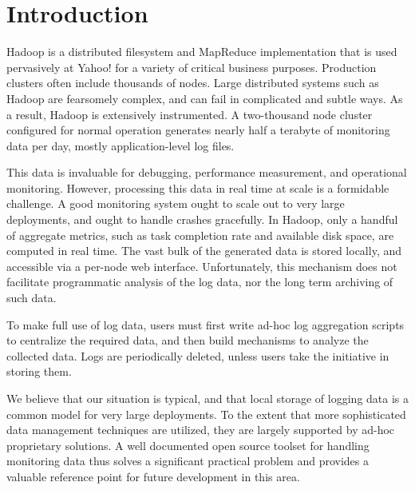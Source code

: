 \documentclass[letterpaper,twocolumn,10pt]{article}
\begin{document}
\section{Introduction}
\label{sec:introduction}

Hadoop is a distributed filesystem and MapReduce \cite{mapreduce} implementation that is used pervasively at Yahoo! for a variety of critical business purposes.  Production clusters often include thousands of nodes. Large distributed systems such as Hadoop are fearsomely complex, and can fail in complicated and subtle ways. As a result, Hadoop is extensively instrumented.  A two-thousand node cluster configured for normal operation generates nearly half a terabyte of monitoring data per day, mostly application-level log files.

This data is invaluable for debugging, performance measurement, and operational monitoring.  However, processing this data in real time at scale is a formidable challenge. A good monitoring system ought to scale out to very large deployments, and ought to handle crashes gracefully.  In Hadoop, only a handful of aggregate metrics, such as task completion rate and available disk space, are computed in real time. The vast bulk of the generated data is stored locally, and accessible via a per-node web interface.  Unfortunately, this mechanism does not facilitate programmatic analysis of the log data, nor the long term archiving of such data.

To make full use of log data, users must first write ad-hoc log aggregation scripts to centralize the required data, and then build mechanisms to analyze the collected data.  Logs are periodically deleted, unless users take the initiative in storing them.

We believe that our situation is typical, and that local storage of logging data is a common model for very large deployments.  To the extent that more sophisticated data management techniques are utilized, they are largely supported by ad-hoc proprietary solutions.  
A well documented open source toolset for handling monitoring data thus solves a significant practical problem and provides a valuable reference point for future development in this area. 
\end{document}
